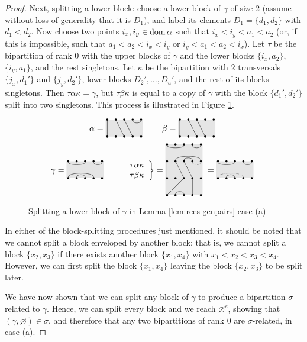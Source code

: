 \begin{lemma}
\begin{proof}
    Next, splitting a lower block: choose a lower block of $\gamma$ of size $2$
    (assume without loss of generality that it is $D_1$), and label its elements
    $D_1 = \{d_1, d_2\}$ with $d_1 < d_2$.  Now choose two points
    $i_x, i_y \in \operatorname{dom}\alpha$ such that $i_x < i_y < a_1 < a_2$ (or, if this is
    impossible, such that $a_1 < a_2 < i_x < i_y$ or $i_y < a_1 < a_2 < i_x$).
    Let $\tau$ be the bipartition of rank $0$ with the upper blocks of $\gamma$
    and the lower blocks $\{i_x, a_2\}$, $\{i_y, a_1\}$, and the rest
    singletons.  Let $\kappa$ be the bipartition with $2$ transversals
    $\{j_x, d_1'\}$ and $\{j_y, d_2'\}$, lower blocks $D_2', \ldots, D_u'$, and
    the rest of its blocks singletons.  Then $\tau\alpha\kappa = \gamma$, but
    $\tau\beta\kappa$ is equal to a copy of $\gamma$ with the block
    $\{d_1', d_2'\}$ split into two singletons.  This process is illustrated in
    Figure \ref{fig:case-a-r0-example-lower}.

    \begin{figure}[h]
      \centering
      $$
      \alpha = \bipartdiag{\tv11 \tv23 \tv34 \tc45} \qquad
      \beta = \bipartdiag{\tv11 \tv23 \tv34}
      $$
      $$
      \gamma = \bipartdiag{\tc13 \tc45 \bC14 \bc23} \qquad
      \left.
        \begin{array}{l}\tau\alpha\kappa\\ \tau\beta\kappa \end{array}
      \right\} = \triplebipartdiag{
        \uutc13 \uutc45 \uubC25 \uubc34
        \utv11 \utv23 \utv34
        \draw[densely dotted](5, 3.875)
        .. controls (5, 3.5) and (4, 3.5)
        .. (4, 3.875);
        \tv31 \bc23 \tv44
      } = \bipartdiag{\tc13 \tc45 \bc23
        \draw[densely dotted](1, 0.125)
        .. controls (1, 0.75) and (4, 0.75)
        .. (4, 0.125);
      }
      $$
      \caption{Splitting a lower block of $\gamma$ in Lemma
        \ref{lem:rees-genpairs} case (a)}
      \label{fig:case-a-r0-example-lower}
    \end{figure}

    In either of the block-splitting procedures just mentioned, it should be
    noted that we cannot split a block enveloped by another block: that is, we
    cannot split a block $\{x_2, x_3\}$ if there exists another block
    $\{x_1, x_4\}$ with $x_1 < x_2 < x_3 < x_4$.  However, we can first split
    the block $\{x_1, x_4\}$ leaving the block $\{x_2, x_3\}$ to be split later.

    We have now shown that we can split any block of $\gamma$ to produce a
    bipartition $\sigma$-related to $\gamma$.  Hence, we can split every block
    and we reach $\varnothing^e$, showing that
    $(\gamma, \varnothing) \in \sigma$, and therefore that any two bipartitions
    of rank 0 are $\sigma$-related, in case (a).


\end{proof}
\end{lemma}
